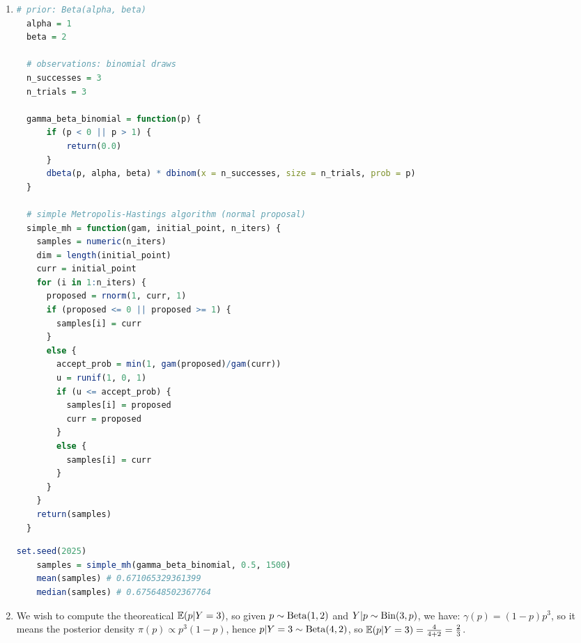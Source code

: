 \documentclass{article}
\begin{document}
\begin{enumerate}
\item 
\begin{lstlisting}[language=R]
  # prior: Beta(alpha, beta)
  alpha = 1
  beta = 2 
  
  # observations: binomial draws
  n_successes = 3 
  n_trials = 3
  
  gamma_beta_binomial = function(p) {
      if (p < 0 || p > 1) {
          return(0.0)
      }
      dbeta(p, alpha, beta) * dbinom(x = n_successes, size = n_trials, prob = p)
  }
  
  # simple Metropolis-Hastings algorithm (normal proposal)
  simple_mh = function(gam, initial_point, n_iters) {
    samples = numeric(n_iters) 
    dim = length(initial_point)
    curr = initial_point
    for (i in 1:n_iters) {
      proposed = rnorm(1, curr, 1)
      if (proposed <= 0 || proposed >= 1) {
        samples[i] = curr
      }
      else {
        accept_prob = min(1, gam(proposed)/gam(curr))
        u = runif(1, 0, 1)
        if (u <= accept_prob) {
          samples[i] = proposed
          curr = proposed
        }
        else {
          samples[i] = curr
        }
      }
    }
    return(samples)
  }
  \end{lstlisting}
  \begin{lstlisting}[language=R]
    set.seed(2025)
    samples = simple_mh(gamma_beta_binomial, 0.5, 1500)
    mean(samples) # 0.671065329361399
    median(samples) # 0.675648502367764
  \end{lstlisting}


\item 
We wish to compute the theoreatical $\mathbb{E}(p | Y = 3)$, so given $p \sim \operatorname{Beta}(1,2)$ and $Y|p \sim \operatorname{Bin}(3, p)$, we have: $\gamma(p) = (1-p)p^3$, so it means the posterior density $\pi(p) \propto p^3(1-p)$, hence $p|Y=3 \sim \operatorname{Beta}(4,2)$, so $\mathbb{E}(p | Y=3) = \frac{4}{4+2} = \frac23$.


\end{enumerate}





 
\end{document}
